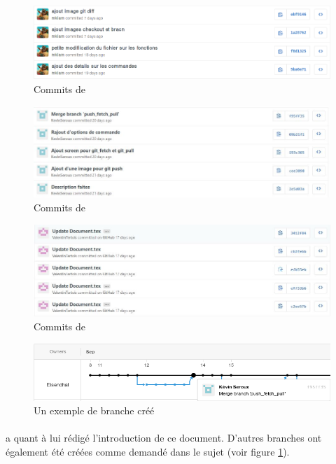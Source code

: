 \documentclass[11pt,canadien]{article}
\begin{document}
\begin{figure}
	\centering
	\includegraphics[width=\textwidth]{images/commit_karen.png}
	\caption{Commits de \karen}
\end{figure}

\begin{figure}
	\centering
	\includegraphics[width=\textwidth]{images/commit_kevin.JPG}
	\caption{Commits de \kevin}
\end{figure}

\begin{figure}
	\centering
	\includegraphics[width=\textwidth]{images/commit_valentin.JPG}
	\caption{Commits de \valentin}
\end{figure}


\begin{figure}
	\centering
	\includegraphics[width=\textwidth]{images/merge_branche.png}
	\caption{Un exemple de branche créé}
	\label{fig:Branche}
\end{figure}

\paragraph{}\antoine a quant à lui rédigé l'introduction de ce document. D'autres branches ont également été créées comme demandé dans le sujet (voir figure \ref{fig:Branche}).
\end{document}
